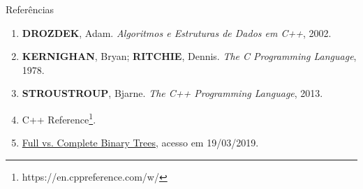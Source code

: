 \begin{frame}[fragile]{Referências}

    \begin{enumerate}
        \item \textbf{DROZDEK}, Adam. \textit{Algoritmos e Estruturas de Dados em C++}, 2002.

        \item \textbf{KERNIGHAN}, Bryan; \textbf{RITCHIE}, Dennis. \textit{The C Programming Language}, 1978.

        \item \textbf{STROUSTROUP}, Bjarne. \textit{The C++ Programming Language}, 2013.

		\item C++ Reference\footnote{https://en.cppreference.com/w/}.

        \item \href{http://web.cecs.pdx.edu/~sheard/course/Cs163/Doc/FullvsComplete.html}{Full vs. Complete Binary Trees}, acesso em 19/03/2019.
    \end{enumerate}

\end{frame}
